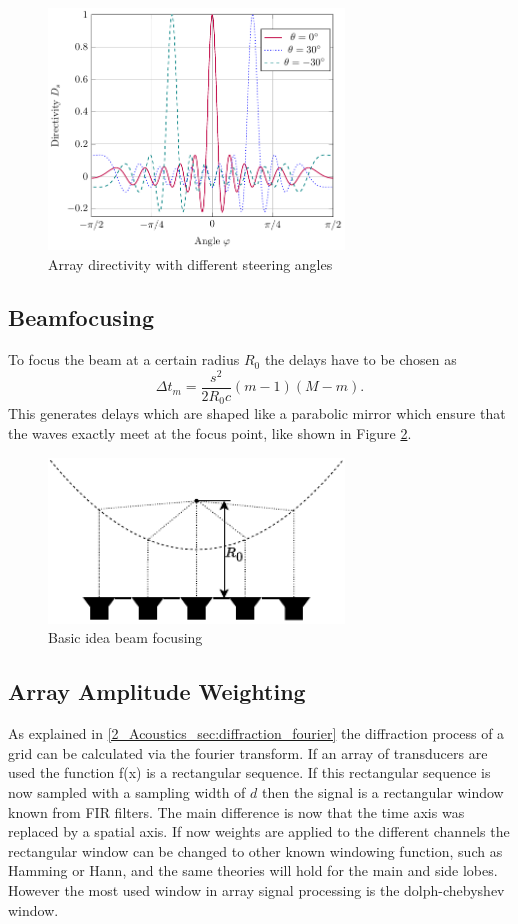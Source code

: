 \begin{figure}
    \centering
    \includegraphics[width=0.7\textwidth]{images/3_Parametric_array/Directivity_Steer.pdf}
    \caption{Array directivity with different steering angles}
    \label{3_fig:directivity_beamsteering}
\end{figure}
\subsection{Beamfocusing}
To focus the beam at a certain radius $R_0$ the delays have to be chosen as
\begin{equation}
    \Delta t_m = \frac{s^2}{2R_0c}(m-1)(M-m).
\end{equation}
This generates delays which are shaped like a parabolic mirror which ensure that the waves exactly meet at the focus point, like shown in Figure \ref{3_fig:beamfocusing}.
\begin{figure}
    \centering
    \includegraphics[width=0.7\textwidth]{images/3_Parametric_array/Beamfocusing.pdf}
    \caption{Basic idea beam focusing}
    \label{3_fig:beamfocusing}
\end{figure}
\subsection{Array Amplitude Weighting}
As explained in \ref{2_Acoustics_sec:diffraction_fourier} the diffraction process of a grid can be calculated via the fourier transform. If an array of transducers are used the function f(x) is a rectangular sequence. If this rectangular sequence is now sampled with a sampling width of $d$ then the signal is a rectangular window known from FIR filters. The main difference is now that the time axis was replaced by a spatial axis.
If now weights are applied to the different channels the rectangular window can be changed to other known windowing function, such as Hamming or Hann, and the same theories will hold for the main and side lobes. However the most used window in array signal processing is the dolph-chebyshev window.  
